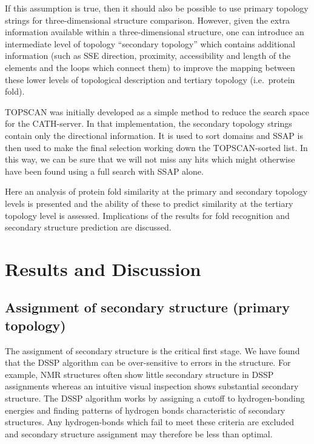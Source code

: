 \documentclass{article}
\begin{document}
If this assumption is true, then it should also be possible to use
primary topology strings for three-dimensional structure comparison.
However, given the extra information available within a
three-dimensional structure, one can introduce an intermediate level
of topology ``secondary topology'' which contains additional
information (such as SSE direction, proximity, accessibility and
length of the elements and the loops which connect them) to improve
the mapping between these lower levels of topological description and
tertiary topology (i.e.\ protein fold).

TOPSCAN was initially developed as a simple method to reduce the
search space for the CATH-server. In that implementation, the secondary
topology strings contain only the directional information.  It is used
to sort domains and SSAP is then used to make the final selection
working down the TOPSCAN-sorted list. In this way, we can be sure that
we will not miss any hits which might otherwise have been found using
a full search with SSAP alone.

Here an analysis of protein fold similarity at the primary and
secondary topology levels is presented and the ability of these to
predict similarity at the tertiary topology level is assessed.
Implications of the results for fold recognition and secondary
structure prediction are discussed.

\section{Results and Discussion}
%
%
%
%

\subsection{Assignment of secondary structure (primary topology)}
The assignment of secondary structure is the critical first stage. We
have found that the DSSP algorithm\cite{kabsch:dictionary} can be
over-sensitive to errors in the structure. For example, NMR structures
often show little secondary structure in DSSP assignments whereas an
intuitive visual inspection shows substantial secondary structure. The
DSSP algorithm works by assigning a cutoff to hydrogen-bonding
energies and finding patterns of hydrogen bonds characteristic of
secondary structures. Any hydrogen-bonds which fail to meet these
criteria are excluded and secondary structure assignment may therefore
be less than optimal.
\end{document}
